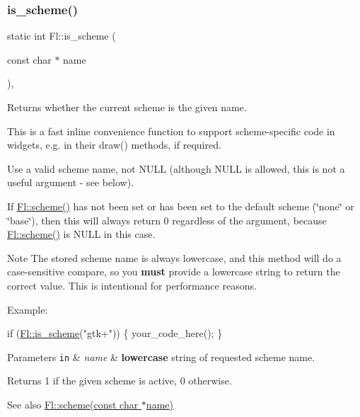 \mbox{\label{class_fl_a19c26018ae654d07ec1aa73e35b244a4}} 
\subsubsection{\texorpdfstring{is\+\_\+scheme()}{is\_scheme()}}
{\footnotesize\ttfamily static int Fl\+::is\+\_\+scheme (\begin{DoxyParamCaption}\item[{const char $\ast$}]{name }\end{DoxyParamCaption})\hspace{0.3cm}{\ttfamily [inline]}, {\ttfamily [static]}}

Returns whether the current scheme is the given name.

This is a fast inline convenience function to support scheme-\/specific code in widgets, e.\+g. in their draw() methods, if required.

Use a valid scheme name, not {\ttfamily N\+U\+LL} (although {\ttfamily N\+U\+LL} is allowed, this is not a useful argument -\/ see below).

If \hyperlink{class_fl_a48e0d5ea99335d7e4cdcf45d8dbe68b7}{Fl\+::scheme()} has not been set or has been set to the default scheme (\char`\"{}none\char`\"{} or \char`\"{}base\char`\"{}), then this will always return 0 regardless of the argument, because \hyperlink{class_fl_a48e0d5ea99335d7e4cdcf45d8dbe68b7}{Fl\+::scheme()} is {\ttfamily N\+U\+LL} in this case.

\begin{DoxyNote}{Note}
The stored scheme name is always lowercase, and this method will do a case-\/sensitive compare, so you {\bfseries must} provide a lowercase string to return the correct value. This is intentional for performance reasons.
\end{DoxyNote}
Example\+: 
\begin{DoxyCode}
\textcolor{keywordflow}{if} (\hyperlink{class_fl_a19c26018ae654d07ec1aa73e35b244a4}{Fl::is\_scheme}(\textcolor{stringliteral}{"gtk+"})) \{ your\_code\_here(); \}
\end{DoxyCode}



\begin{DoxyParams}[1]{Parameters}
\mbox{\tt in}  & {\em name} & {\bfseries lowercase} string of requested scheme name.\\
\hline
\end{DoxyParams}
\begin{DoxyReturn}{Returns}
1 if the given scheme is active, 0 otherwise.
\end{DoxyReturn}
\begin{DoxySeeAlso}{See also}
\hyperlink{class_fl_ad774b1783b1860e39556e209062648eb}{Fl\+::scheme(const char $\ast$name)} 
\end{DoxySeeAlso}
\mbox{\label{class_fl_a1f2a298d306f170fbb8d3caa7ebb079f}} 
